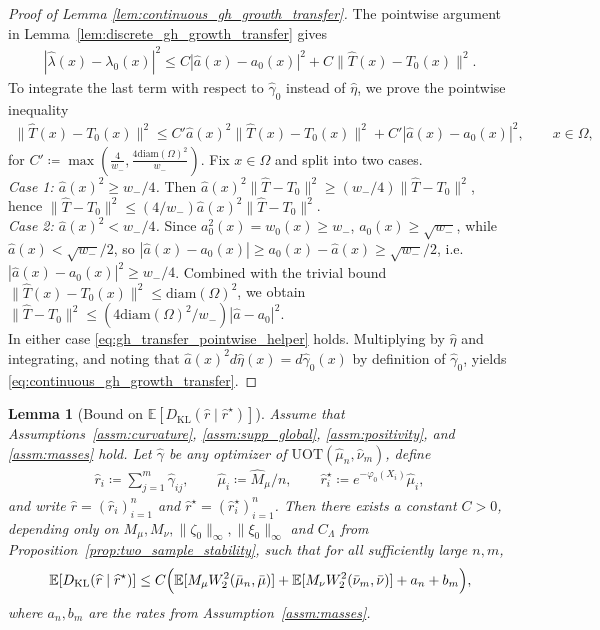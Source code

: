\documentclass[11pt,reqno]{amsart}
\newtheorem{lemma}[theorem]{Lemma}
\theoremstyle{definition}
\newcommand{\KL}{\mathrm{KL}}
\renewcommand{\hat}{\widehat}
\newcommand{\Ep}{\mathbb{E}}
\begin{document}
\begin{proof}[Proof of Lemma \ref{lem:continuous_gh_growth_transfer}]
The pointwise argument in Lemma~\ref{lem:discrete_gh_growth_transfer} gives
\begin{align*}
    |\hat\lambda(x)-\lambda_0(x)|^2
    \le
    C|\hat a(x)-a_0(x)|^2+C\|\hat T(x)-T_0(x)\|^2.
\end{align*}
To integrate the last term with respect to $\hat\gamma_0$ instead of $\hat\eta$, we
prove the pointwise inequality
\begin{align}
\label{eq:gh_transfer_pointwise_helper}
    \|\hat T(x)-T_0(x)\|^2
    \le
    C'\hat a(x)^2\|\hat T(x)-T_0(x)\|^2+C'|\hat a(x)-a_0(x)|^2,
    \qquad x\in\Omega,
\end{align}
for $C'\coloneqq \max \left(\tfrac{4}{w_-}, \tfrac{4 \mathrm{diam}(\Omega)^2}{w_-}\right)$.
Fix $x\in\Omega$ and split into two cases.
\smallskip\\
\emph{Case 1: $\hat a(x)^2\ge w_-/4$.} Then
$\hat a(x)^2\|\hat T-T_0\|^2\ge (w_-/4)\|\hat T-T_0\|^2$, hence
$\|\hat T-T_0\|^2\le (4/w_-)\hat a(x)^2\|\hat T-T_0\|^2$.
\smallskip\\
\emph{Case 2: $\hat a(x)^2<w_-/4$.} Since $a_0^2(x)=w_0(x)\ge w_-$,
$a_0(x)\ge \sqrt{w_-}$, while $\hat a(x)<\sqrt{w_-}/2$, so
$|\hat a(x)-a_0(x)|\ge a_0(x)-\hat a(x)\ge \sqrt{w_-}/2$, i.e.\
$|\hat a(x)-a_0(x)|^2\ge w_-/4$. Combined with the trivial bound
$\|\hat T(x)-T_0(x)\|^2\le \mathrm{diam}(\Omega)^2$, we obtain
$\|\hat T-T_0\|^2\le (4 \mathrm{diam}(\Omega)^2/w_-)|\hat a-a_0|^2$.
\smallskip\\
In either case \eqref{eq:gh_transfer_pointwise_helper} holds.
Multiplying by $\hat\eta$ and integrating, and noting that
$\hat a(x)^2 d\hat\eta(x)=d\hat\gamma_0(x)$ by definition of $\hat\gamma_0$,
yields \eqref{eq:continuous_gh_growth_transfer}.
\end{proof}


\begin{lemma}[{Bound on $\Ep[D_\KL(\hat r\mid\hat r^\star)]$}]
\label{lem:uot_fitted_row_kl_expect}
Assume that Assumptions~\ref{assm:curvature}, \ref{assm:supp_global}, \ref{assm:positivity}, and \ref{assm:masses} hold.
Let $\hat\gamma$ be any optimizer of $\mathrm{UOT}(\hat\mu_n,\hat\nu_m)$, define
\begin{align*}
    \hat r_i \coloneqq \sum_{j=1}^m \hat\gamma_{ij},
    \qquad
    \hat\mu_i \coloneqq {\hat M_\mu/n},
    \qquad
    \hat r_i^\star \coloneqq e^{-\varphi_0(X_i)}\hat\mu_i,
\end{align*}
and write $\hat r=(\hat r_i)_{i=1}^n$ and $\hat r^\star=(\hat r_i^\star)_{i=1}^n$.
Then there exists a constant $C>0$, depending only on
\(
M_\mu,M_\nu,\|\zeta_0\|_\infty,\|\xi_0\|_\infty
\)
and $C_\Lambda$ from Proposition~\ref{prop:two_sample_stability}, such that for all sufficiently large $n,m$,
\begin{align}
\label{eq:uot_fitted_row_kl_expect}
    \Ep[{D_\KL}(\hat r\mid \hat r^\star)]
    \le
    C
    \Bigl(
        \Ep[M_\mu W_2^2(\bar\mu_n,\bar\mu)]
        + \Ep[M_\nu W_2^2(\bar\nu_m,\bar\nu)]
        + a_n + b_m
    \Bigr),
\end{align}
where $a_n,b_m$ are the rates from Assumption~\ref{assm:masses}.
\end{lemma}
\end{document}
